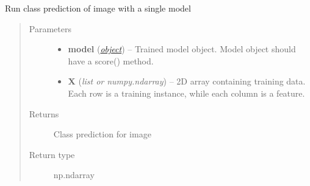 \documentclass[letterpaper,10pt,english]{sphinxmanual}
\begin{document}
\begin{fulllineitems}
\label{classification:flamingo.classification.models.predict_model}
Run class prediction of image with a single model
\begin{quote}\begin{description}
\item[{Parameters}] \leavevmode\begin{itemize}
\item {} 
\textbf{model} (\href{http://docs.python.org/library/functions.html\#object}{\emph{object}}) -- Trained model object. Model object should have a score() method.

\item {} 
\textbf{X} (\emph{list or numpy.ndarray}) -- 2D array containing training data.
Each row is a training instance, while each column is a feature.

\end{itemize}

\item[{Returns}] \leavevmode
Class prediction for image

\item[{Return type}] \leavevmode
np.ndarray

\end{description}\end{quote}

\end{fulllineitems}

\end{document}

